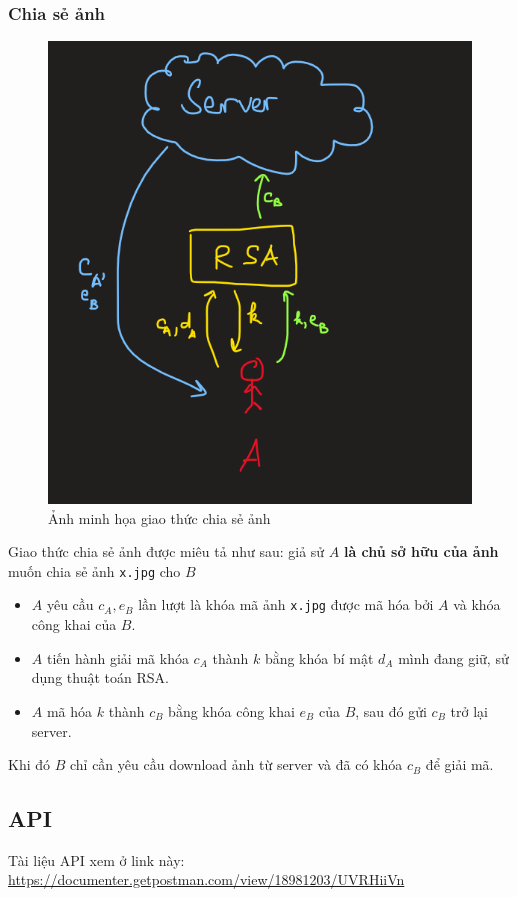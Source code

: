 \documentclass[12pt]{article}
\begin{document}
\subsubsection{Chia sẻ ảnh}
\begin{figure}[H]
\centering
\includegraphics[]{sharing-protocol.png}
\caption{Ảnh minh họa giao thức chia sẻ ảnh}
\end{figure}

Giao thức chia sẻ ảnh được miêu tả như sau: giả sử $A$ \textbf{là chủ sở hữu của ảnh} muốn chia sẻ ảnh \texttt{x.jpg} cho $B$
\begin{itemize}
\item $A$ yêu cầu $c_A, e_B$ lần lượt là khóa mã ảnh \texttt{x.jpg} được mã hóa bởi $A$ và khóa công khai của $B$.
\item $A$ tiến hành giải mã khóa $c_A$ thành $k$ bằng khóa bí mật $d_A$ mình đang giữ, sử dụng thuật toán RSA.
\item $A$ mã hóa $k$ thành $c_B$ bằng khóa công khai $e_B$ của $B$, sau đó gửi $c_B$ trở lại server.
\end{itemize}
Khi đó $B$ chỉ cần yêu cầu download ảnh từ server và đã có khóa $c_B$ để giải mã.

\subsection{API}
Tài liệu API xem ở link này: \href{https://documenter.getpostman.com/view/18981203/UVRHiiVn}{https://documenter.getpostman.com/view/18981203/UVRHiiVn}
\end{document}
